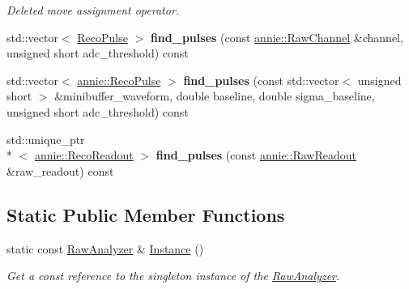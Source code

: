 \begin{DoxyCompactItemize}
\begin{DoxyCompactList}\small\item\em Deleted move assignment operator. \end{DoxyCompactList}\item 
\hypertarget{classannie_1_1RawAnalyzer_ae71304d77ec7309755408850c6df2848}{std\-::vector$<$ \hyperlink{classannie_1_1RecoPulse}{Reco\-Pulse} $>$ {\bfseries find\-\_\-pulses} (const \hyperlink{classannie_1_1RawChannel}{annie\-::\-Raw\-Channel} \&channel, unsigned short adc\-\_\-threshold) const }\label{classannie_1_1RawAnalyzer_ae71304d77ec7309755408850c6df2848}

\item 
\hypertarget{classannie_1_1RawAnalyzer_a7a07548a1aa7a73e7fc06553ea55f885}{std\-::vector$<$ \hyperlink{classannie_1_1RecoPulse}{annie\-::\-Reco\-Pulse} $>$ {\bfseries find\-\_\-pulses} (const std\-::vector$<$ unsigned short $>$ \&minibuffer\-\_\-waveform, double baseline, double sigma\-\_\-baseline, unsigned short adc\-\_\-threshold) const }\label{classannie_1_1RawAnalyzer_a7a07548a1aa7a73e7fc06553ea55f885}

\item 
\hypertarget{classannie_1_1RawAnalyzer_ad0381d0696ff97227c3c307dd42e3f3f}{std\-::unique\-\_\-ptr\\*
$<$ \hyperlink{classannie_1_1RecoReadout}{annie\-::\-Reco\-Readout} $>$ {\bfseries find\-\_\-pulses} (const \hyperlink{classannie_1_1RawReadout}{annie\-::\-Raw\-Readout} \&raw\-\_\-readout) const }\label{classannie_1_1RawAnalyzer_ad0381d0696ff97227c3c307dd42e3f3f}

\end{DoxyCompactItemize}
\subsection*{Static Public Member Functions}
\begin{DoxyCompactItemize}
\item 
\hypertarget{classannie_1_1RawAnalyzer_a830d493693fd7c5e567b4fd592745d81}{static const \hyperlink{classannie_1_1RawAnalyzer}{Raw\-Analyzer} \& \hyperlink{classannie_1_1RawAnalyzer_a830d493693fd7c5e567b4fd592745d81}{Instance} ()}\label{classannie_1_1RawAnalyzer_a830d493693fd7c5e567b4fd592745d81}

\begin{DoxyCompactList}\small\item\em Get a const reference to the singleton instance of the \hyperlink{classannie_1_1RawAnalyzer}{Raw\-Analyzer}. \end{DoxyCompactList}\end{DoxyCompactItemize}
